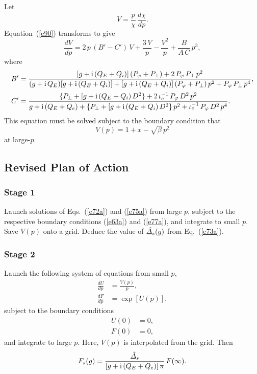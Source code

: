 \documentclass[titlepage=false,12pt]{article}
\begin{document}
Let 
\begin{equation}
V= \frac{p}{\chi}\,\frac{d\chi}{dp}.
\end{equation}
Equation~(\ref{e90}) transforms to give 
\begin{equation}\label{e75a}
\frac{dV}{dp} = 2\,p\,(B'-C')\,V + \frac{3\,V}{p} - \frac{V^2}{p} + \frac{B}{A\,C}\,p^3,
\end{equation}
where 
\begin{align}
B' &= \frac{ [g+{\rm i}\,(Q_E+Q_i)]\,(P_\varphi+P_\perp)+ 2\,P_\varphi\,P_\perp\,p^2}{ (g+{\rm i}\,Q_E)[g+{\rm i}\,(Q_E+Q_i)] + [g+{\rm i}\,(Q_E+Q_i)]\,(P_\varphi+P_\perp)\,p^2+ P_\varphi\,P_\perp\,p^4},\\[0.5ex]
C'&=\frac{\{P_\perp + [g+{\rm i}\,(Q_E+Q_i)\,D^2\}+ 2\,\iota_e^{-1}\,P_\varphi\,D^2\,p^2}{g + {\rm i}\,(Q_E+Q_e) +\{P_\perp + [g+{\rm i}\,(Q_E+Q_i)\,D^2\}\,p^2 + \iota_e^{-1}\,P_\varphi\,D^2\,p^4}.
\end{align}
This equation must be solved subject to the boundary condition that
\begin{equation}\label{e77a}
V(p) = 1+x-\sqrt{\beta}\,p^2
\end{equation}
at large-$p$. 

\subsection{Revised Plan of Action}
\subsubsection{Stage 1}
Launch solutions of Eqs.~(\ref{e72a}) and (\ref{e75a}) from large $p$, subject to the respective boundary conditions (\ref{e63a}) and (\ref{e77a}), and
integrate to small $p$. Save $V(p)$ onto a grid. Deduce the value of $\hat{\mit\Delta}_s(g)$ from Eq.~(\ref{e73a}). 

\subsubsection{Stage 2}
Launch the following system of equations from small $p$, 
\begin{align}
\frac{dU}{dp} &= \frac{V(p)}{p},\\[0.5ex]
\frac{dF}{dp} &=\exp[U(p)],
\end{align}
subject to the boundary conditions
\begin{align}
U(0) &=0,\\[0.5ex]
F(0) &= 0,
\end{align}
and integrate to large $p$. Here, $V(p)$ is interpolated from the grid. 
Then
\begin{equation}
F_s(g) = \frac{\hat{\mit\Delta}_s}{[g+{\rm i}\,(Q_E+Q_e)]\,\pi}\, F(\infty).
\end{equation}
\end{document}
